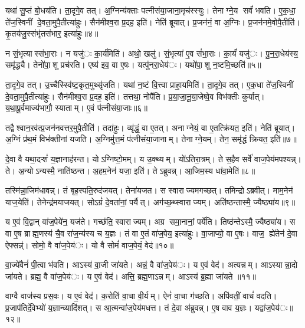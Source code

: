 यथा॑ सु॒प्तं बो॒धय॑ति। ता॒दृगे॒व तत्। अ॒ग्निन्य॑क्ताः पत्नीसंया॒जाना॒मृच॑स्स्युः। तेनाग्ने॒य सर्वं॑ भवति। ए॒क॒धा॒ ते॑ज॒स्विनीं दे॒वता॒मुपै॒तीत्या॑हुः। सैन॑मीश्व॒रा प्र॒दह॒ इति॑। नेति॑ ब्रूयात्। प्र॒जन॑नं॒ वा अ॒ग्निः। प्र॒जन॑नमे॒वोपै॒तीति॑। कृ॒तय॑जु॒स्संभृ॑तसंभार॒ इत्या॑हुः॥४॥

न सं॒भृत्यास्संभा॒राः। न यजु॑ः का॒र्य॑मिति॑। अथो॒ खलु॑। सं॒भृत्या॑ ए॒व सं॑भा॒राः। का॒र्यं॑ यजु॑ः। पु॒न॒रा॒धेय॑स्य॒ समृ॑द्ध्यै। तेनो॑पा॒शु प्रच॑रति। एष्य॑ इव॒ वा ए॒षः। यत्पु॑नरा॒धेय॑ः। यथो॑पा॒शु न॒ष्टमि॒च्छति॑॥५॥

ता॒दृगे॒व तत्। उ॒च्चैस्स्वि॑ष्ट॒कृत॒मुथ्सृ॑जति। यथा॑ न॒ष्टं वि॒त्त्वा प्राहा॒यमिति॑। ता॒दृगे॒व तत्। ए॒क॒धा ते॑ज॒स्विनीं दे॒वता॒मुपै॒तीत्या॑हुः। सैन॑मीश्व॒रा प्र॒दह॒ इति॑। तत्तथा॒ नोपै॑ति। प्र॒या॒जा॒नू॒या॒जेष्वे॒व विभ॑क्तीः कुर्यात्। य॒था॒पू॒र्वमाज्य॑भागौ॒ स्याताम्। ए॒वं प॑त्नीसंया॒जाः॥६॥

तद्वैश्वान॒रव॑त्प्र॒जन॑नवत्तर॒मुपै॒तीति॑। तदा॑हुः। व्यृ॑द्धं॒ वा ए॒तत्। अनाग्नेयं॒ वा ए॒तत्क्रि॑यत॒ इति॑। नेति॑ ब्रूयात्। अ॒ग्निं प्र॑थ॒मं विभ॑क्तीनां यजति। अ॒ग्निमु॑त्त॒मं प॑त्नीसंया॒जानाम्। तेनाग्ने॒यम्। तेन॒ समृ॑द्धं क्रियत॒ इति॑॥७॥


दे॒वा वै यथा॒दऱ्शं॑ य॒ज्ञानाह॑रन्त। योऽग्निष्टो॒मम्। य उ॒क्थ्यम्। यो॑ऽतिरा॒त्रम्। ते स॒हैव सर्वे॑ वाज॒पेय॑मपश्यन्न्। ते। अ॒न्योऽन्यस्मै॒ नाति॑ष्ठन्त। अ॒हम॒नेन॑ यजा॒ इति॑। तेऽब्रुवन्न्। आ॒जिम॒स्य धा॑वा॒मेति॑॥८॥

तस्मि॑न्ना॒जिम॑धावन्न्। तं बृह॒स्पति॒रुद॑जयत्। तेना॑यजत। स स्वाराज्यमगच्छत्। तमिन्द्रोऽब्रवीत्। माम॒नेन॑ याज॒येति॑। तेनेन्द्र॑मयाजयत्। सोऽग्रं॑ दे॒वता॑नां॒ पर्यैत्। अग॑च्छ॒थ्स्वाराज्यम्। अति॑ष्ठन्तास्मै॒ ज्यैष्ठ्या॑य॥९॥

य ए॒वं वि॒द्वान् वा॑ज॒पेये॑न॒ यज॑ते। गच्छ॑ति॒ स्वाराज्यम्। अग्र समा॒नानां॒ पर्ये॑ति। तिष्ठ॑न्तेऽस्मै॒ ज्यैष्ठ्या॑य। स वा ए॒ष ब्राह्म॒णस्य॑ चै॒व रा॑ज॒न्य॑स्य च य॒ज्ञः। तं वा ए॒तं वा॑ज॒पेय॒ इत्या॑हुः। वा॒जाप्यो॒ वा ए॒षः। वाज॒ ह्ये॑तेन॑ दे॒वा ऐफ्सन्न्॑। सोमो॒ वै वा॑ज॒पेय॑ः। यो वै सोमं॑ वाज॒पेयं॒ वेद॑॥१०॥

वा॒ज्ये॑वैनं॑ पी॒त्वा भ॑वति। आऽस्य॑ वा॒जी जा॑यते। अन्नं॒ वै वा॑ज॒पेय॑ः। य ए॒वं वेद॑। अत्यन्नम्। आऽस्यान्ना॒दो जा॑यते। ब्रह्म॒ वै वा॑ज॒पेय॑ः। य ए॒वं वेद॑। अत्ति॒ ब्रह्म॒णाऽन्नम्। आऽस्य॑ ब्र॒ह्मा जा॑यते ॥११॥

वाग्वै वाज॑स्य प्रस॒वः। य ए॒वं वेद॑। क॒रोति॑ वा॒चा वी॒र्यम्। ऐनं॑ वा॒चा ग॑च्छति। अपि॑वतीं॒ वाचं॑ वदति। प्र॒जाप॑तिर्दे॒वेभ्यो॑ य॒ज्ञान्व्यादि॑शत्। स आ॒त्मन्वा॑ज॒पेय॑मधत्त। तं दे॒वा अ॑ब्रुवन्न्। ए॒ष वाव य॒ज्ञः। यद्वा॑ज॒पेय॑ः॥१२॥

